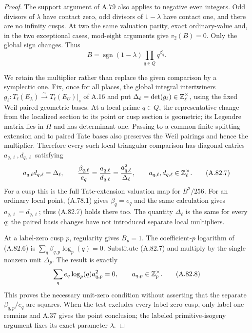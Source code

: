 \begin{proof}
The support argument of A.79 also applies to negative even
integers.  Odd divisors of $\lambda$ have contact zero,
odd divisors of $1-\lambda$ have contact one, and there
are no infinity cusps.  At two the same valuation parity,
exact ordinary-value and, in the two exceptional cases,
mod-eight arguments give $v_2(B)=0$.
Only the global sign changes.  Thus
\[
          B=\operatorname{sgn}(1-\lambda)
                                  \prod_{q\in Q}q^{\beta_q}.
\tag{A.82.6}
\]

We retain the multiplier rather than replace the given
comparison by a symplectic one.  Fix, once for all places,
the global integral intertwiners
$g_\ell:T_\ell(E_\lambda)\xrightarrow{\sim}
T_\ell(E_U)|_s$ of A.16 and put
$\Delta_\ell=\det(g_\ell)\in\mathbb Z_\ell^\times$, using
the fixed Weil-paired geometric bases.
At a local prime $q\in Q$, the representative change
from the localized section to its point or cusp section
is geometric; its Legendre matrix lies in $H$ and has
determinant one.  Passing to a common finite splitting
extension and to paired Tate bases also preserves the
Weil pairings and hence the multiplier.
Therefore every such local triangular comparison has
diagonal entries $a_{q,\ell},d_{q,\ell}$ satisfying
\[
 a_{q,\ell}d_{q,\ell}=\Delta_\ell,
 \qquad
 \frac{\beta_{q,\ell}}{e_q}
       =\frac{a_{q,\ell}}{d_{q,\ell}}
       =\frac{a_{q,\ell}^{2}}{\Delta_\ell},
 \qquad a_{q,\ell},d_{q,\ell}\in\mathbb Z_\ell^\times.
\tag{A.82.7}
\]
For a cusp this is the full Tate-extension valuation map
for $B^2/256$.  For an ordinary local point, (A.78.1)
gives $\beta_q=e_q$ and the same calculation gives
$a_{q,\ell}=d_{q,\ell}$; thus (A.82.7) holds there too.
The quantity $\Delta_\ell$ is the same for every $q$;
the paired basis changes have not introduced separate
local multipliers.

At a label-zero cusp $p$, regularity gives $B_p=1$.
The coefficient-$p$ logarithm of (A.82.6) is
$\sum_q\beta_{q,p}\log_p(q)=0$.
Substitute (A.82.7) and multiply by the single nonzero
unit $\Delta_p$.  The result is exactly
\[
                   \sum_q e_q\log_p(q)a_{q,p}^2=0,
                       \qquad a_{q,p}\in\mathbb Z_p^\times.
\tag{A.82.8}
\]
This proves the necessary unit-zero condition without
asserting that the separate $\beta_{q,p}/e_q$ are squares.
When the test excludes every label-zero cusp, only
label one remains and A.37 gives the point conclusion;
the labeled primitive-isogeny argument fixes its exact
parameter $\lambda$.


\end{proof}

